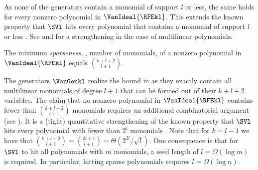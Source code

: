 As none of the generators contain a monomial of support $l$ or less, the same holds for every nonzero polynomial in $\VanIdeal{\RFEkl}$.
This extends the known property that $\SVl$ hits every polynomial that contains a monomial of support $l$ or less \cite{ShpilkaVolkovich2008}. 
See  and  for a strengthening in the case of multilinear polynomials. 

\begin{corollary}
    \label{cor.rfe.sparseness}
    The minimum {\em sparseness}, \ie, number of monomials, of a nonzero
    polynomial in $\VanIdeal{\RFEkl}$ equals $\binom{k+l+2}{l+1}$.
\end{corollary}
The generators $\VanGenkl$ realize the bound in  as they exactly contain all
multilinear monomials of degree $l+1$ that can be formed out of their
$k+l+2$ variables.
The claim that no nonzero polynomial in $\VanIdeal{\RFEkl}$ contains fewer
than $\binom{k+l+2}{l+1}$ monomials requires an additional combinatorial
argument (see ). 
It is a (tight) quantitative strengthening of the known property that
$\SVl$ hits every polynomial with fewer than $2^l$ monomials
\cite{AvMV2011,GKST2015,Forbes2015,FSV2018}.
Note that for $k=l-1$ we have that
$\binom{k+l+2}{l+1} = \binom{2l+1}{l+1} = \Theta(2^{2l}/\sqrt{l})$.
One consequence is that for $\SVl$ to hit all polynomials with $m$ monomials, a seed length of $l=\Omega(\log m)$ is required. In particular, hitting sparse polynomials requires $l = \Omega(\log n)$. 

